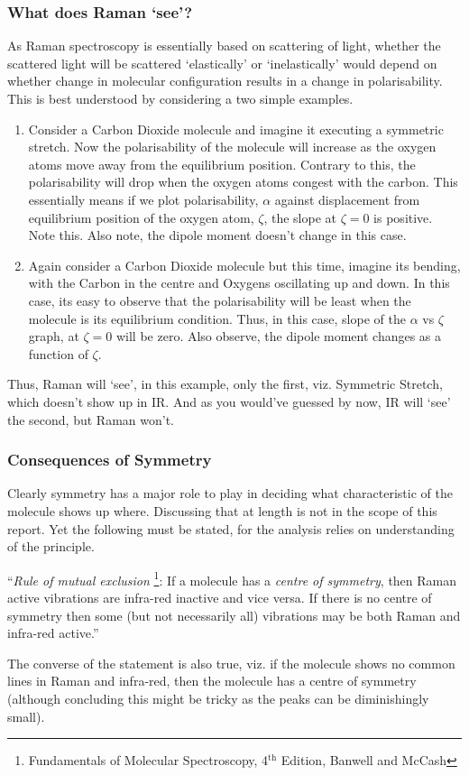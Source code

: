 	\subsubsection*{What does Raman `see'?}
	As Raman spectroscopy is essentially based on scattering of light, whether the scattered light will be scattered `elastically' or `inelastically' would depend on whether change in molecular configuration results in a change in polarisability.  This is best understood by considering a two simple examples. 
	\begin{enumerate}
		\item Consider a Carbon Dioxide molecule and imagine it executing a symmetric stretch. Now the polarisability of the molecule will increase as the oxygen atoms move away from the equilibrium position. Contrary to this, the polarisability will drop when the oxygen atoms congest with the carbon. This essentially means if we plot polarisability, $\alpha$ against displacement from equilibrium position of the oxygen atom, $\zeta$, the slope at $\zeta=0$ is positive. Note this. Also note, the dipole moment doesn't change in this case.
		\item Again consider a Carbon Dioxide molecule but this time, imagine its bending, with the Carbon in the centre and Oxygens oscillating up and down. In this case, its easy to observe that the polarisability will be least when the molecule is its equilibrium condition. Thus, in this case, slope of the $\alpha$ vs $\zeta$ graph, at $\zeta=0$ will be zero.    Also observe, the dipole moment changes as a function of $\zeta$.
	\end{enumerate}
	Thus, Raman will `see', in this example, only the first, viz. Symmetric Stretch, which doesn't show up in IR. And as you would've guessed by now, IR will `see' the second, but Raman won't.

	\subsubsection*{Consequences of Symmetry}
	Clearly symmetry has a major role to play in deciding what characteristic of the molecule shows up where. Discussing that at length is not in the scope of this report. Yet the following must be stated, for the analysis relies on understanding of the principle.
	\par
	``\emph{Rule of mutual exclusion} \footnote{Fundamentals of Molecular Spectroscopy, 4$^{\text{th}}$ Edition, Banwell and McCash}: If a molecule has a \emph{centre of symmetry}, then Raman active vibrations are infra-red inactive and vice versa. If there is no centre of symmetry then some (but not necessarily all) vibrations may be both Raman and infra-red active.''
	\par
	The converse of the statement is also true, viz. if the molecule shows no common lines in Raman and infra-red, then the molecule has a centre of symmetry (although concluding this might be tricky as the peaks can be diminishingly small).

